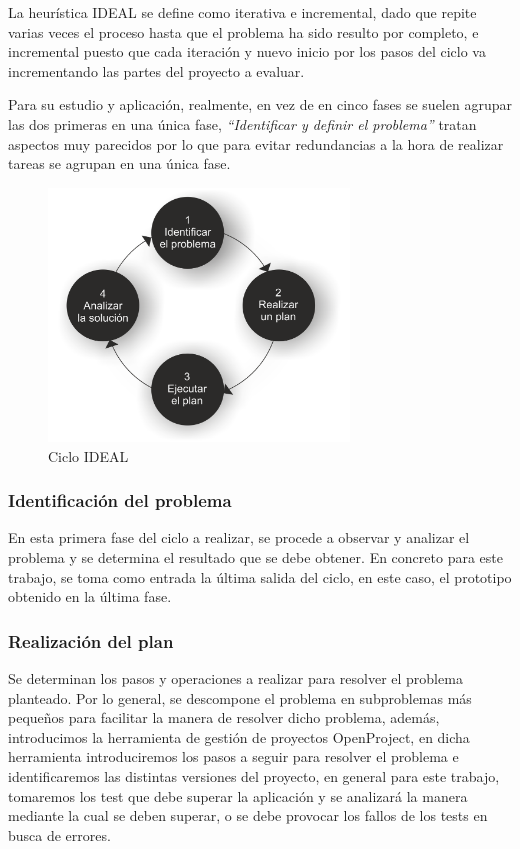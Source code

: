 \documentclass{pre-tfg}
\begin{document}
La heurística IDEAL se define como iterativa e incremental, dado que repite varias veces el proceso hasta que el problema ha sido resulto por completo, e incremental puesto que cada iteración y nuevo inicio por los pasos del ciclo va incrementando las partes del proyecto a evaluar.

Para su estudio y aplicación, realmente, en vez de en cinco fases se suelen agrupar las dos primeras en una única fase\cite{Perales94}, \textit{``Identificar y definir el problema''} tratan aspectos muy parecidos por lo que para evitar redundancias a la hora de realizar tareas se agrupan en una única fase.

\begin{figure}[!h]
\centering
   \includegraphics[width=8cm]{Ciclo_IDEAL.png}
\caption{Ciclo IDEAL}
\end{figure}

\subsubsection{Identificación del problema}

En esta primera fase del ciclo a realizar, se procede a observar y analizar el problema y se determina el resultado que se debe obtener. En concreto para este trabajo, se toma como entrada la última salida del ciclo, en este caso, el prototipo obtenido en la última fase.

\subsubsection{Realización del plan}

Se determinan los pasos y operaciones a realizar para resolver el problema planteado. Por lo general, se descompone el problema en subproblemas más pequeños para facilitar la manera de resolver dicho problema, además, introducimos la herramienta de gestión de proyectos OpenProject\cite{OpenProject}, en dicha herramienta introduciremos los pasos a seguir para resolver el problema e identificaremos las distintas versiones del proyecto, en general para este trabajo, tomaremos los test que debe superar la aplicación y se analizará la manera mediante la cual se deben superar, o se debe provocar los fallos de los tests en busca de errores.
\end{document}
